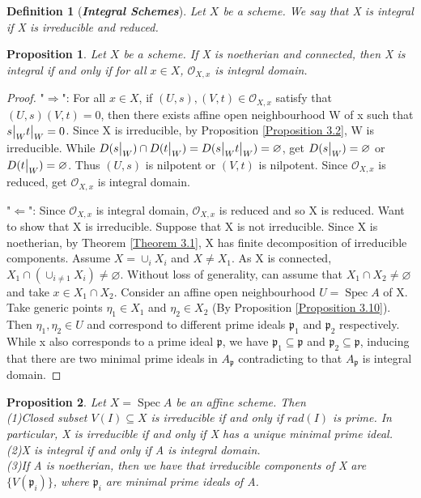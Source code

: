 \documentclass{ctexart}
\newtheorem{definition}{Definition}[section]
\newtheorem{proposition}{Proposition}[section]
\newcommand{\spec}{\operatorname{Spec}}
\begin{document}
\begin{definition}[\textbf{\emph{Integral Schemes}}]
    Let $X$ be a scheme.
    We say that X is integral if X is irreducible and reduced.
\end{definition}
\begin{proposition}
    Let $X$ be a scheme.
    If X is noetherian and connected, then X is integral if and only if for all $x\in X$, $\mathcal{O}_{X, x}$ is integral domain.
    \label{Proposition 3.7}
\end{proposition}
\begin{proof}
    "$\Rightarrow$": For all $x\in X$, if $(U, s),(V, t)\in \mathcal{O}_{X, x}$ satisfy that $(U, s)(V, t) = 0$,
    then there exists affine open neighbourhood W of x such that $s\big{|}_{W}t\big{|}_{W} = 0$.
    Since X is irreducible, by Proposition \ref{Proposition 3.2}, W is irreducible.
    While $D(s\big{|}_{W}) \cap D(t\big{|}_{W}) = D(s\big{|}_{W}t\big{|}_{W}) = \varnothing$, get $D(s\big{|}_{W}) = \varnothing$ or $D(t\big{|}_{W}) = \varnothing$.
    Thus $(U, s)$ is nilpotent or $(V, t)$ is nilpotent.
    Since $\mathcal{O}_{X, x}$ is reduced, get $\mathcal{O}_{X, x}$ is integral domain.
    \par
    "$\Leftarrow$": Since $\mathcal{O}_{X, x}$ is integral domain, $\mathcal{O}_{X, x}$ is reduced and so X is reduced.
    Want to show that X is irreducible.
    Suppose that X is not irreducible.
    Since X is noetherian, by Theorem \ref{Theorem 3.1}, X has finite decomposition of irreducible components.
    Assume $X = \cup_{i} X_{i}$ and $X \neq X_{1}$.
    As X is connected, $X_{1} \cap (\cup_{i \neq 1} X_{i}) \neq \varnothing$.
    Without loss of generality, can assume that $X_{1} \cap X_{2} \neq \varnothing$ and take $x\in X_{1} \cap X_{2}$.
    Consider an affine open neighbourhood $U = \spec A$ of X.
    Take generic points $\eta_{1}\in X_{1}$ and $\eta_{2}\in X_{2}$ (By Proposition \ref{Proposition 3.10}).
    Then $\eta_{1},\eta_{2}\in U$ and correspond to different prime ideals $\mathfrak{p}_{1}$ and $\mathfrak{p}_{2}$ respectively.
    While x also corresponds to a prime ideal $\mathfrak{p}$, we have $\mathfrak{p}_{1} \subseteq \mathfrak{p}$ and $\mathfrak{p}_{2} \subseteq \mathfrak{p}$,
    inducing that there are two minimal prime ideals in $A_{\mathfrak{p}}$ contradicting to that $A_{\mathfrak{p}}$ is integral domain.
\end{proof}
\begin{proposition}
    Let $X = \spec A$ be an affine scheme.
    Then \\
    (1)Closed subset $V(I) \subseteq X$ is irreducible if and only if $rad(I)$ is prime.
    In particular, X is irreducible if and only if X has a unique minimal prime ideal. \\
    (2)X is integral if and only if A is integral domain. \\
    (3)If A is noetherian, then we have that irreducible components of X are $\{V(\mathfrak{p}_{i})\}$, where $\mathfrak{p}_{i}$ are minimal prime ideals of A.
    \label{Proposition 3.8}
\end{proposition}
\end{document}
